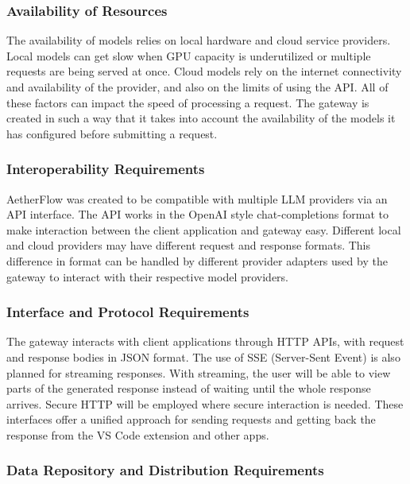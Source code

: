 \documentclass{FastFyp}
\begin{document}
\subsubsection{Availability of Resources}

The availability of models relies on local hardware and cloud service providers. Local models can get slow when GPU capacity is underutilized or multiple requests are being served at once. Cloud models rely on the internet connectivity and availability of the provider, and also on the limits of using the API. All of these factors can impact the speed of processing a request. The gateway is created in such a way that it takes into account the availability of the models it has configured before submitting a request.

\subsubsection{Interoperability Requirements}

AetherFlow was created to be compatible with multiple LLM providers via an API interface. The API works in the OpenAI style chat-completions format to make interaction between the client application and gateway easy. Different local and cloud providers may have different request and response formats. This difference in format can be handled by different provider adapters used by the gateway to interact with their respective model providers.

\subsubsection{Interface and Protocol Requirements}

The gateway interacts with client applications through HTTP APIs, with request and response bodies in JSON format. The use of SSE (Server-Sent Event) is also planned for streaming responses. With streaming, the user will be able to view parts of the generated response instead of waiting until the whole response arrives. Secure HTTP will be employed where secure interaction is needed. These interfaces offer a unified approach for sending requests and getting back the response from the VS Code extension and other apps.

\subsubsection{Data Repository and Distribution Requirements}
\end{document}
